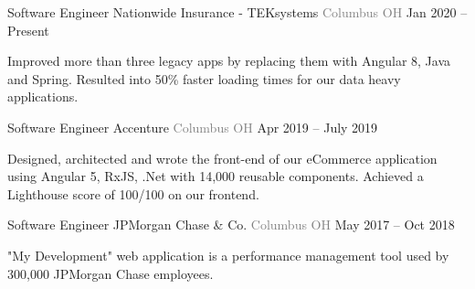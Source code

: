 \vspace{-2mm}
\begin{cventries}
    \vspace{-1mm}  \cventry
    {Software Engineer}
    {\hspace*{0.5mm}\bullet \hspace*{0.5mm} Nationwide Insurance - TEKsystems }
    {\textcolor{graytext}{Columbus OH}}
    {Jan 2020 – Present}
    {\begin{cvitems}\item {Improved more than three legacy apps by replacing them with Angular 8, Java and Spring. Resulted into 50\% faster loading times for our data heavy applications. }\end{cvitems}   \vspace{-1mm}   
    }
\cventry
    {Software Engineer}
    {\hspace*{0.5mm}\bullet \hspace*{0.5mm} Accenture}
    {\textcolor{graytext}{Columbus OH}}
    {Apr 2019 – July 2019}
    {\begin{cvitems}\item {Designed, architected and wrote the front-end of our eCommerce application using Angular 5, RxJS, .Net with 14,000 reusable components. Achieved a Lighthouse score of 100/100 on our frontend.}\end{cvitems}   \vspace{-1mm}   
    }   
\cventry
    {Software Engineer}
    {\hspace*{0.5mm}\bullet \hspace*{0.5mm} JPMorgan Chase \& Co.}
    {\textcolor{graytext}{Columbus OH}}
    {May 2017 – Oct 2018}
    {\begin{cvitems}\item {"My Development" web application is a performance management tool used by 300,000 JPMorgan Chase employees.}\end{cvitems}
    }   
\end{cventries}
